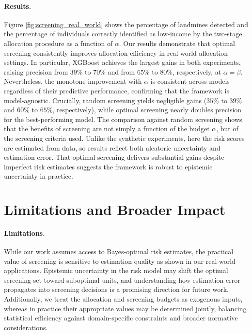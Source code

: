 \paragraph{Results.} Figure \ref{fig:screening_real_world} shows the percentage of landmines detected and the percentage of individuals correctly identified as low-income by the two-stage allocation procedure as a function of $\alpha$. Our results demonstrate that optimal screening consistently improves allocation efficiency in real-world allocation settings. In particular, XGBoost achieves the largest gains in both experiments, raising precision from $39\%$ to $70\%$ and from $65\%$ to $80\%$, respectively, at $\alpha = \beta$. Nevertheless, the monotone improvement with $\alpha$ is consistent across models regardless of their predictive performance, confirming that the framework is model-agnostic. Crucially, random screening yields negligible gains ($35\%$ to $39\%$ and $60\%$ to $65\%$, respectively), while optimal screening nearly doubles precision for the best-performing model. The comparison against random screening shows that the benefits of screening are not simply a function of the budget $\alpha$, but of the screening criteria used. Unlike the synthetic experiments, here the risk scores are estimated from data, so results reflect both aleatoric uncertainty and estimation error. That optimal screening delivers substantial gains despite imperfect risk estimates suggests the framework is robust to epistemic uncertainty in practice.





\section{Limitations and Broader Impact}

\paragraph{Limitations.} While our work assumes access to Bayes-optimal risk estimates, the practical value of screening is sensitive to estimation quality as shown in our real-world applications. Epistemic uncertainty in the risk model may shift the optimal screening set toward suboptimal units, and understanding how estimation error propagates into screening decisions is a promising direction for future work. Additionally, we treat the allocation and screening budgets as exogenous inputs, whereas in practice their appropriate values may be determined jointly, balancing statistical efficiency against domain-specific constraints and broader normative considerations.

